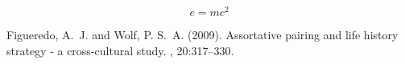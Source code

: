 \documentclass[oneside,onecolumn]{article}
\begin{document}
\begin{equation}
  \label{eq:emc}
  e = mc^2
\end{equation}



\begin{thebibliography}{99} %

  Figueredo, A.~J. and Wolf, P. S.~A. (2009).
  \newblock Assortative pairing and life history strategy - a cross-cultural
  study.
  , 20:317--330.
  
\end{thebibliography}

\end{document}
